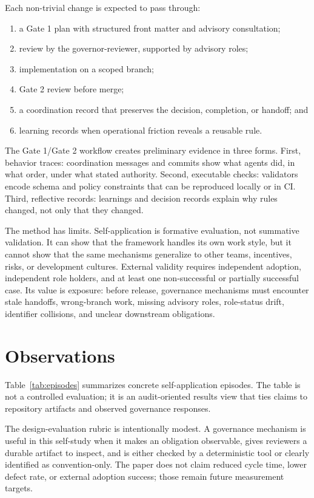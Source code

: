 \documentclass[conference]{IEEEtran}
\begin{document}
Each non-trivial change is expected to pass through:

\begin{enumerate}
  \item a Gate 1 plan with structured front matter and advisory consultation;
  \item review by the governor-reviewer, supported by advisory roles;
  \item implementation on a scoped branch;
  \item Gate 2 review before merge;
  \item a coordination record that preserves the decision, completion, or handoff; and
  \item learning records when operational friction reveals a reusable rule.
\end{enumerate}

The Gate 1/Gate 2 workflow creates preliminary evidence in three forms. First, behavior traces: coordination messages and commits show what agents did, in what order, under what stated authority. Second, executable checks: validators encode schema and policy constraints that can be reproduced locally or in CI. Third, reflective records: learnings and decision records explain why rules changed, not only that they changed.

The method has limits. Self-application is formative evaluation, not summative validation. It can show that the framework handles its own work style, but it cannot show that the same mechanisms generalize to other teams, incentives, risks, or development cultures. External validity requires independent adoption, independent role holders, and at least one non-successful or partially successful case. Its value is exposure: before release, governance mechanisms must encounter stale handoffs, wrong-branch work, missing advisory roles, role-status drift, identifier collisions, and unclear downstream obligations.

\section{Observations}

Table~\ref{tab:episodes} summarizes concrete self-application episodes. The table is not a controlled evaluation; it is an audit-oriented results view that ties claims to repository artifacts and observed governance responses.

The design-evaluation rubric is intentionally modest. A governance mechanism is useful in this self-study when it makes an obligation observable, gives reviewers a durable artifact to inspect, and is either checked by a deterministic tool or clearly identified as convention-only. The paper does not claim reduced cycle time, lower defect rate, or external adoption success; those remain future measurement targets.
\end{document}
